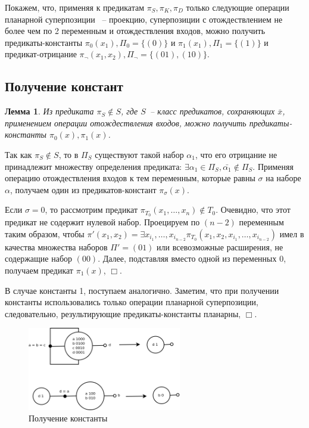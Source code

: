 \documentclass[12pt]{article}
\newtheorem{lemma}[theorem]{Лемма}
\newenvironment{proof}[1][Доказательство]{\begin{trivlist}
\item[\hskip \labelsep {\bfseries #1}]}{\end{trivlist}}
\begin{document}
Покажем, что, применяя к предикатам $\pi_S, \pi_K, \pi_D$ только следующие операции планарной суперпозиции ~-- проекцию,
суперпозиции с отождествлением не более чем по 2 переменным и отождествления входов, 
можно получить предикаты-константы
$\pi_0(x_1), \Pi_0=\{ (0) \}$ и $\pi_1(x_1), \Pi_1=\{ (1) \}$ и предикат-отрицание 
$\pi_{\neg}(x_1, x_2), \Pi_{\neg}=\{ (01), (10) \}$.

\subsection{Получение констант}
\begin{lemma}
\label{eq:const}
Из предиката $\pi_S \notin S$, где $S$~-- класс предикатов, сохраняющих $\bar{x}$, 
применением операции отождествления входов,
можно получить предикаты-константы $\pi_0(x), \pi_1(x)$.
\end{lemma}

\begin{proof}
Так как $\pi_S \notin S$, то в $\Pi_S$ существуют такой набор
$\alpha_1$, что его отрицание не принадлежит множеству определения предиката:
$\exists \alpha_1 \in \Pi_S, \bar{\alpha_1} \notin \Pi_S$.
Применяя операцию отождествления входов к тем переменным, которые равны $\sigma$ на наборе $\alpha$,
получаем один из предикатов-констант $\pi_{\sigma}(x)$.

Если $\sigma = 0$, то рассмотрим предикат 
$\pi_{T_0}(x_1, \dots, x_n) \notin T_0$. Очевидно, что этот предикат не содержит нулевой набор. 
Проецируем по $(n-2)$ переменным таким образом, чтобы 
$\pi'(x_1, x_2) = \exists {x_{i_1}, \dots, x_{i_{n-2}}} \pi_{T_0}(x_1, x_2, x_{i_1}, \dots, x_{i_{n-2}})$
имел в качества множества наборов $\Pi' = { (01) }$ или всевозможные расширения, не содержащие набор $(00)$.
Далее, подставляя вместо одной из переменных 0, получаем предикат $\pi_1(x)$, $\Box$. 

В случае константы 1, поступаем аналогично. 
Заметим, что при получении константы использовались только операции планарной суперпозиции, следовательно, 
результирующие предикаты-константы планарны, $\Box$.
\end{proof}
\begin{figure}[htb]
\centering
\includegraphics[width=0.6\textwidth]{const.png}
\caption{Получение константы}
\label{fig:constant}
\end{figure}
\end{document}
